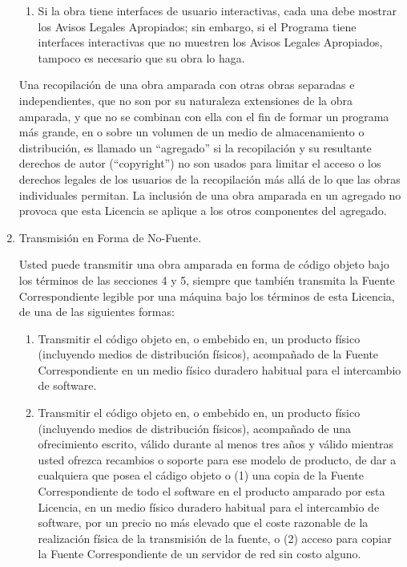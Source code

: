 \documentclass[11pt]{article}
\begin{document}
\begin{enumerate}
\begin{enumerate}
  \item Si la obra tiene interfaces de usuario interactivas, cada una 
  debe mostrar los Avisos Legales Apropiados; sin embargo, si el Programa 
  tiene interfaces interactivas que no muestren los Avisos Legales 
  Apropiados, tampoco es necesario que su obra lo haga.
\end{enumerate}
Una recopilaci\'{o}n de una obra amparada con otras obras separadas e 
independientes, que no son por su naturaleza extensiones de la obra 
amparada, y que no se combinan con ella con el fin de formar un programa 
m\'{a}s grande, en o sobre un volumen de un medio de almacenamiento o 
distribuci\'{o}n, es llamado un ``agregado'' si la recopilaci\'{o}n y su 
resultante derechos de autor (``copyright'') no son usados para limitar el acceso o los 
derechos legales de los usuarios de la recopilaci\'{o}n m\'{a}s all\'{a} de lo que 
las obras individuales permitan.  La inclusi\'{o}n de una obra amparada en 
un agregado no provoca que esta Licencia se aplique a los otros 
componentes del agregado.

\item Transmisi\'{o}n en Forma de No-Fuente.

Usted puede transmitir una obra amparada en forma de c\'{o}digo objeto 
bajo los t\'{e}rminos de las secciones 4 y 5, siempre que tambi\'{e}n transmita
la Fuente Correspondiente legible por una m\'{a}quina bajo los t\'{e}rminos de 
esta Licencia, de una de las siguientes formas:
  \begin{enumerate}
  \item Transmitir el c\'{o}digo objeto en, o embebido en, un producto f\'{i}sico 
    (incluyendo medios de distribuci\'{o}n f\'{i}sicos), acompa\~nado de la Fuente 
    Correspondiente en un medio f\'{i}sico duradero habitual para el 
    intercambio de software.

  \item Transmitir el c\'{o}digo objeto en, o embebido en, un producto f\'{i}sico 
    (incluyendo medios de distribuci\'{o}n f\'{i}sicos), acompa\~nado de una 
    ofrecimiento escrito, v\'{a}lido durante al menos tres a\~nos y v\'{a}lido 
    mientras usted ofrezca recambios o soporte para ese modelo de 
    producto, de dar a cualquiera que posea el c\'{a}digo objeto o (1) una
    copia de la Fuente Correspondiente de todo el software en el 
    producto amparado por esta Licencia, en un medio f\'{i}sico duradero 
    habitual para el intercambio de software, por un precio no m\'{a}s 
    elevado que el coste razonable de la realizaci\'{o}n f\'{i}sica de la 
    transmisi\'{o}n de la fuente, o (2) acceso para copiar la Fuente 
    Correspondiente de un servidor de red sin costo alguno.


\end{enumerate}
\end{enumerate}
\end{document}
